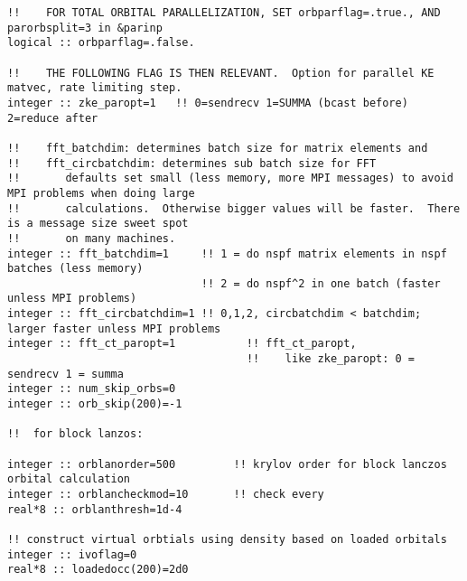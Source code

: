 \begin{verbatim}
!!    FOR TOTAL ORBITAL PARALLELIZATION, SET orbparflag=.true., AND parorbsplit=3 in &parinp
logical :: orbparflag=.false.

!!    THE FOLLOWING FLAG IS THEN RELEVANT.  Option for parallel KE matvec, rate limiting step.
integer :: zke_paropt=1   !! 0=sendrecv 1=SUMMA (bcast before) 2=reduce after

!!    fft_batchdim: determines batch size for matrix elements and 
!!    fft_circbatchdim: determines sub batch size for FFT 
!!       defaults set small (less memory, more MPI messages) to avoid MPI problems when doing large 
!!       calculations.  Otherwise bigger values will be faster.  There is a message size sweet spot
!!       on many machines.
integer :: fft_batchdim=1     !! 1 = do nspf matrix elements in nspf batches (less memory)
                              !! 2 = do nspf^2 in one batch (faster unless MPI problems)
integer :: fft_circbatchdim=1 !! 0,1,2, circbatchdim < batchdim; larger faster unless MPI problems
integer :: fft_ct_paropt=1           !! fft_ct_paropt,
                                     !!    like zke_paropt: 0 = sendrecv 1 = summa
integer :: num_skip_orbs=0
integer :: orb_skip(200)=-1

!!  for block lanzos:

integer :: orblanorder=500         !! krylov order for block lanczos orbital calculation
integer :: orblancheckmod=10       !! check every
real*8 :: orblanthresh=1d-4

!! construct virtual orbtials using density based on loaded orbitals
integer :: ivoflag=0
real*8 :: loadedocc(200)=2d0
\end{verbatim}
